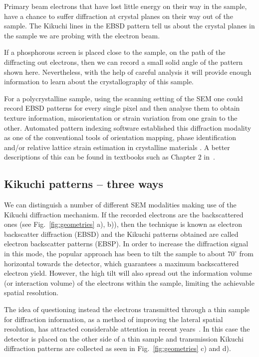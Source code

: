 Primary beam electrons that have lost little energy on their way in the sample, have a chance to suffer diffraction at crystal planes on their way out of the sample. The Kikuchi lines in the EBSD pattern tell us about the crystal planes in the sample we are probing with the electron beam. 


 If a phosphorous screen is placed close to the sample, on the path of the diffracting out electrons, then we can record a small solid angle of the pattern shown here. Nevertheless, with the help of careful analysis it will provide enough information to learn about the crystallography of this sample. 
 
 For a polycrystalline sample, using the scanning setting of the SEM one could record  EBSD patterns for every single pixel and then analyse them to obtain texture information, misorientation or strain variation from one grain to the other.  Automated pattern indexing software established this diffraction modality as one of the conventional tools of orientation mapping, phase identification and/or relative lattice strain estimation in crystalline materials \cite{schwartz2009a}. A better descriptions of this can be found in textbooks such as Chapter 2 in~\cite{Maitland07}.



\subsection{Kikuchi patterns -- three ways}
\label{sec:Kikuchi}





We can distinguish a number of different SEM modalities making use of the Kikuchi diffraction mechanism. If the recorded electrons are the backscattered ones (see Fig.~\ref{fig:geometries} a), b)), then the technique is known as electron backscatter diffraction (EBSD) and the Kikuchi patterns obtained are called electron backscatter patterns (EBSP).  In order to increase the diffraction signal in this mode, the popular approach has been to tilt the sample to about $70^{\circ}$ from horizontal towards the detector, which guarantees a maximum backscattered electron yield. However, the high tilt will also spread out the information volume (or interaction volume) of the electrons within the sample, limiting the achievable spatial resolution.


The idea of questioning instead the electrons transmitted through a thin sample for diffraction information, as a method of improving the lateral spatial resolution, has attracted considerable attention in recent years~\cite{Trimby12,Keller12}. In this case the detector is placed on the other side of a thin sample and transmission Kikuchi diffraction patterns are collected as seen in Fig.~\ref{fig:geometries} c) and d).


